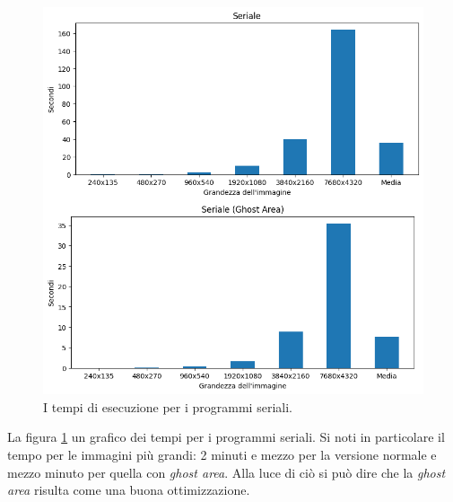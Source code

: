 \documentclass[12pt,a4paper,openright,twoside]{report}
\begin{document}
\begin{figure}[h]
    \centering
    \includegraphics[width=\textwidth]{graphs_serial.png}
    \caption{I tempi di esecuzione per i programmi seriali.}
    \label{img:times_ser}
\end{figure}

La figura \ref{img:times_ser} un grafico dei tempi per i programmi seriali. Si noti in particolare il tempo per le immagini più grandi: 2 minuti e mezzo per la versione normale e mezzo minuto per quella con \textit{ghost area}. Alla luce di ciò si può dire che la \textit{ghost area} risulta come una buona ottimizzazione.
\end{document}
